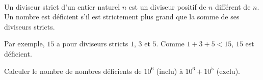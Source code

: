 \exer{[NBR-004]}
\setcounter{numques}{0}~\\

Un diviseur strict d'un entier naturel $n$ est un diviseur positif de $n$ différent de $n$. Un nombre est déficient s'il est strictement plus grand que la somme de ses diviseurs stricts. 

Par exemple, $15$ a pour diviseurs stricts $1$, $3$ et $5$. Comme $1+3+5 < 15$, $15$ est déficient. 

\question{} Calculer le nombre de nombres déficients de $10^6$ (inclu) à $10^6+10^5$ (exclu).